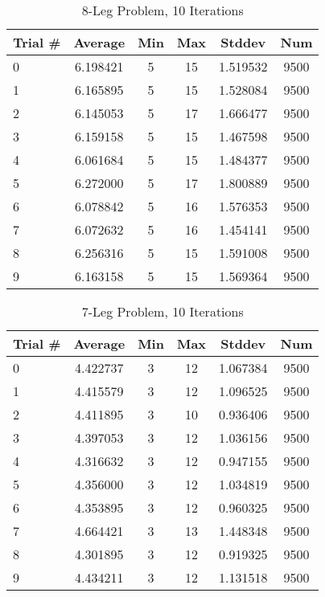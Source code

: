 \documentclass{article}
\begin{document}
\begin{table}
\centering
\begin{tabular}{|l|c|c|c|c|c|}
\hline
Trial \# & Average & Min & Max & Stddev & Num \\
\hline
0 & 6.198421 & 5 & 15 & 1.519532 & 9500 \\ 
1 & 6.165895 & 5 & 15 & 1.528084 & 9500 \\ 
2 & 6.145053 & 5 & 17 & 1.666477 & 9500 \\ 
3 & 6.159158 & 5 & 15 & 1.467598 & 9500 \\ 
4 & 6.061684 & 5 & 15 & 1.484377 & 9500 \\ 
5 & 6.272000 & 5 & 17 & 1.800889 & 9500 \\ 
6 & 6.078842 & 5 & 16 & 1.576353 & 9500 \\ 
7 & 6.072632 & 5 & 16 & 1.454141 & 9500 \\ 
8 & 6.256316 & 5 & 15 & 1.591008 & 9500 \\ 
9 & 6.163158 & 5 & 15 & 1.569364 & 9500 \\
\hline
\end{tabular}
\caption{8-Leg Problem, 10 Iterations}
\label{tab:template}
\end{table}

\begin{table}
\centering
\begin{tabular}{|l|c|c|c|c|c|}
\hline
Trial \# & Average & Min & Max & Stddev & Num \\
\hline
0 & 4.422737 & 3 & 12 & 1.067384 & 9500 \\ 
1 & 4.415579 & 3 & 12 & 1.096525 & 9500 \\ 
2 & 4.411895 & 3 & 10 & 0.936406 & 9500 \\ 
3 & 4.397053 & 3 & 12 & 1.036156 & 9500 \\ 
4 & 4.316632 & 3 & 12 & 0.947155 & 9500 \\ 
5 & 4.356000 & 3 & 12 & 1.034819 & 9500 \\ 
6 & 4.353895 & 3 & 12 & 0.960325 & 9500 \\ 
7 & 4.664421 & 3 & 13 & 1.448348 & 9500 \\ 
8 & 4.301895 & 3 & 12 & 0.919325 & 9500 \\ 
9 & 4.434211 & 3 & 12 & 1.131518 & 9500 \\
\hline
\end{tabular}
\caption{7-Leg Problem, 10 Iterations}
\label{tab:template}
\end{table}
\end{document}
